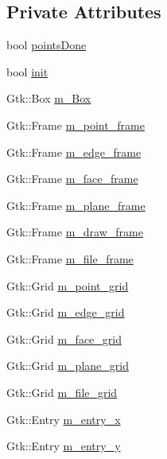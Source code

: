 \subsection*{Private Attributes}
\begin{DoxyCompactItemize}
\item 
bool \hyperlink{class_projection_window_a5565d17186a7132c7e05ad548fc281c7}{points\+Done}
\item 
bool \hyperlink{class_projection_window_aef738e0adb09fefd45156e1a6fc3c70d}{init}
\item 
Gtk\+::\+Box \hyperlink{class_projection_window_a64bf2dbad67a693ad6ed2cd8997e1411}{m\+\_\+\+Box}
\item 
Gtk\+::\+Frame \hyperlink{class_projection_window_aabeb017ae2e6ba96e419504e822f4df9}{m\+\_\+point\+\_\+frame}
\item 
Gtk\+::\+Frame \hyperlink{class_projection_window_a0d40290228e486792d89c40e02db9b70}{m\+\_\+edge\+\_\+frame}
\item 
Gtk\+::\+Frame \hyperlink{class_projection_window_a68f8977eeac19179749a830b5e8ea8c3}{m\+\_\+face\+\_\+frame}
\item 
Gtk\+::\+Frame \hyperlink{class_projection_window_ac3266587c32c7ecc2f06adb36c357478}{m\+\_\+plane\+\_\+frame}
\item 
Gtk\+::\+Frame \hyperlink{class_projection_window_a7a91b92d0b2f07d0c4adecc26dbbdd5d}{m\+\_\+draw\+\_\+frame}
\item 
Gtk\+::\+Frame \hyperlink{class_projection_window_a06143fa33aa0b7987f3bb4039d14d6fa}{m\+\_\+file\+\_\+frame}
\item 
Gtk\+::\+Grid \hyperlink{class_projection_window_aef8298430d6a30cc5461576e5f05e6a7}{m\+\_\+point\+\_\+grid}
\item 
Gtk\+::\+Grid \hyperlink{class_projection_window_afac168fe347d64c1a707848d6d57cb01}{m\+\_\+edge\+\_\+grid}
\item 
Gtk\+::\+Grid \hyperlink{class_projection_window_a586d2739f221f9bb4c85806f6246a29d}{m\+\_\+face\+\_\+grid}
\item 
Gtk\+::\+Grid \hyperlink{class_projection_window_a9219931edb2e16362527561d81603f4c}{m\+\_\+plane\+\_\+grid}
\item 
Gtk\+::\+Grid \hyperlink{class_projection_window_a6ebf47b33e793ff26d150bbb1ad88287}{m\+\_\+file\+\_\+grid}
\item 
Gtk\+::\+Entry \hyperlink{class_projection_window_a9212d24d4c2e89da86e473e906f1c8e1}{m\+\_\+entry\+\_\+x}
\item 
Gtk\+::\+Entry \hyperlink{class_projection_window_a231608efc30a4785358397c304e67b98}{m\+\_\+entry\+\_\+y}

\end{DoxyCompactItemize}
